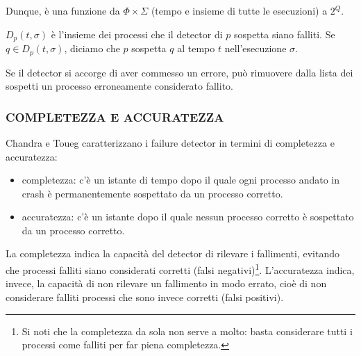 Dunque, è una funzione da $\Phi \times \Sigma$ (tempo e insieme di tutte le esecuzioni) a $2^{Q}$.

$D_{p}(t, \sigma)$ è l'insieme dei processi che il detector di $p$ sospetta siano falliti. Se $q \in D_{p}(t, \sigma)$, diciamo che $p$ sospetta $q$ al tempo $t$ nell'esecuzione $\sigma$.

Se il detector si accorge di aver commesso un errore, può rimuovere dalla lista dei sospetti un processo erroneamente considerato fallito.

\subsubsection{COMPLETEZZA E ACCURATEZZA}

Chandra e Toueg caratterizzano i failure detector in termini di completezza e accuratezza: 
\begin{itemize}
    \item completezza: c'è un istante di tempo dopo il quale ogni processo andato in crash è permanentemente sospettato da un processo corretto.
    \item accuratezza: c'è un istante dopo il quale nessun processo corretto è sospettato da un processo corretto.
\end{itemize}
La completezza indica la capacità del detector di rilevare i fallimenti, evitando che processi falliti siano considerati corretti (falsi negativi)\footnote{Si noti che la completezza da sola non serve a molto: basta considerare tutti i processi come falliti per far piena completezza.}. L'accuratezza indica, invece, la capacità di non rilevare un fallimento in modo errato, cioè di non considerare falliti processi che sono invece corretti (falsi positivi). 

